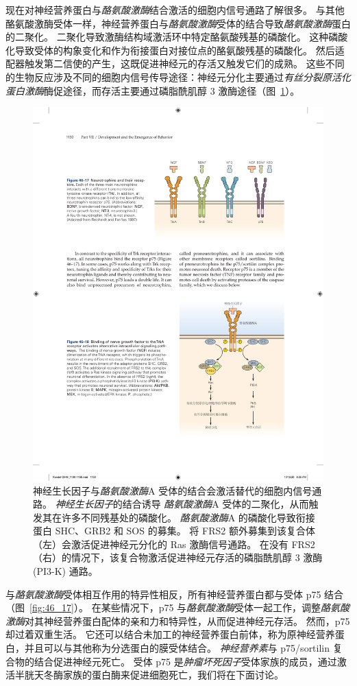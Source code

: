 现在对神经营养蛋白与\textit{酪氨酸激酶}结合激活的细胞内信号通路了解很多。
与其他酪氨酸激酶受体一样，神经营养蛋白与\textit{酪氨酸激酶}受体的结合导致\textit{酪氨酸激酶}蛋白的二聚化。
二聚化导致激酶结构域激活环中特定酪氨酸残基的磷酸化。
这种磷酸化导致受体的构象变化和作为衔接蛋白对接位点的酪氨酸残基的磷酸化。
然后适配器触发第二信使的产生，这既促进神经元的存活又触发它们的成熟。
这些不同的生物反应涉及不同的细胞内信号传导途径：神经元分化主要通过\textit{有丝分裂原活化蛋白激酶}酶促途径，而存活主要通过磷脂酰肌醇 3 激酶途径（图~\ref{fig:46_18}）。


\begin{figure}[htbp]
	\centering
	\includegraphics[width=0.55\linewidth]{chap46/fig_46_18}
	\caption{神经生长因子与\textit{酪氨酸激酶}A 受体的结合会激活替代的细胞内信号通路。
		\textit{神经生长因子}的结合诱导 \textit{酪氨酸激酶}A 受体的二聚化，从而触发其在许多不同残基处的磷酸化。
		\textit{酪氨酸激酶}A 的磷酸化导致衔接蛋白 SHC、GRB2 和 SOS 的募集。
		将 FRS2 额外募集到该复合体（左）会激活促进神经元分化的 Ras 激酶信号通路。
		在没有 FRS2（右）的情况下，该复合物激活促进神经元存活的磷脂酰肌醇 3 激酶 (PI3-K) 通路。}
	\label{fig:46_18}
\end{figure}


与\textit{酪氨酸激酶}受体相互作用的特异性相反，所有神经营养蛋白都与受体 p75 结合（图~\ref{fig:46_17}）。
在某些情况下，p75 与\textit{酪氨酸激酶}受体一起工作，调整\textit{酪氨酸激酶}对其神经营养蛋白配体的亲和力和特异性，从而促进神经元存活。
然而，p75 却过着双重生活。
它还可以结合未加工的神经营养蛋白前体，称为原神经营养蛋白，并且可以与其他称为分选蛋白的膜受体结合。
\textit{神经营养素}与 p75/sortilin 复合物的结合促进神经元死亡。
受体 p75 是\textit{肿瘤坏死因子}受体家族的成员，通过激活半胱天冬酶家族的蛋白酶来促进细胞死亡，我们将在下面讨论。


